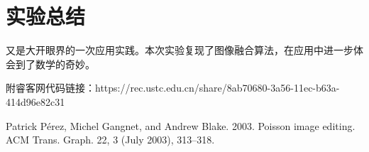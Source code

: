 \documentclass[12pt]{article}
\begin{document}
	\section{实验总结}
	又是大开眼界的一次应用实践。本次实验复现了图像融合算法，在应用中进一步体会到了数学的奇妙。
	
	附睿客网代码链接：https://rec.ustc.edu.cn/share/8ab70680-3a56-11ec-b63a-414d96e82c31
	
	\begin{thebibliography}{99}
	
		Patrick Pérez, Michel Gangnet, and Andrew Blake. 2003. Poisson image editing. ACM Trans. Graph. 22, 3 (July 2003), 313–318. 
		
	\end{thebibliography}
\end{document}
